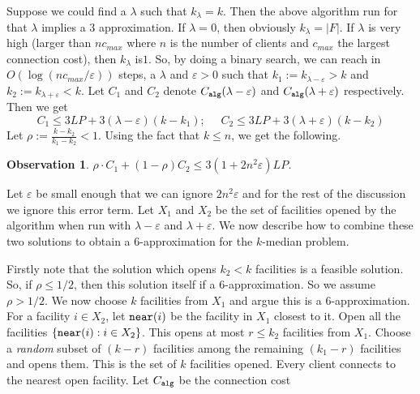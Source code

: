 \documentclass[11pt]{article}
\newtheorem{observation}{Observation}
\def\eps{\varepsilon}
\def\alg{{\tt alg}}
\begin{document}
Suppose we could find a $\lambda$ such that $k_{\lambda} = k$. Then the above algorithm run for that $\lambda$ implies a $3$ approximation. If $\lambda = 0$, then obviously $k_\lambda = |F|$. If $\lambda$ is very high (larger than $nc_{max}$ where $n$ is the number of clients and $c_{max}$ the largest connection cost), then $k_\lambda$ is$1$. So, by doing a binary search, we can reach in $O\left(\log(nc_{max}/\eps)\right)$ steps, 
a $\lambda$ and $\eps > 0$ such that $k_1 := k_{\lambda - \eps} > k$ and $k_2 := k_{\lambda + \eps} < k$. Let $C_1$ and $C_2$ denote $C_{\alg}(\lambda - \eps)$ and $C_{\alg}(\lambda + \eps)$ respectively. Then we get
\def\near{{\tt near}}
$$C_1 \le 3LP + 3(\lambda - \eps)(k - k_1); ~~~~~~ C_2 \le 3LP + 3(\lambda + \eps)(k - k_2)$$
\noindent
Let $\rho := \frac{k - k_2}{k_1 - k_2} < 1$. Using the fact that $k\le n$, we get the following.
\begin{observation}
$\rho\cdot C_1 + (1-\rho)C_2 \le 3(1+2n^2\eps)LP$.
\end{observation}
\noindent
Let $\eps$ be small enough that we can ignore $2n^2\eps$ and for the rest of the discussion we ignore this error term. Let $X_1$ and $X_2$ be the set of facilities opened by the algorithm when run with $\lambda - \eps$ and $\lambda + \eps$. We now describe how to combine these two solutions to obtain a $6$-approximation for the $k$-median problem.

Firstly note that the solution which opens $k_2 < k$ facilities is a feasible solution. So, if $\rho \le 1/2$, then this solution itself if a $6$-approximation. So we assume $\rho > 1/2$. We now choose $k$ facilities from $X_1$ and argue this is a $6$-approximation. For a facility $i\in X_2$, let $\near(i)$ be the facility in $X_1$ closest to it. Open all the facilities $\{\near(i):i\in X_2\}$. This opens at most $r \le k_2$ facilities from $X_1$. 
Choose a {\em random} subset of $(k - r)$ facilities among the remaining $(k_1 - r)$ facilities and opens them. This is the set of $k$ facilities opened. Every client connects to the nearest open facility. 
Let $C_{\alg}$ be the connection cost 
\end{document}
